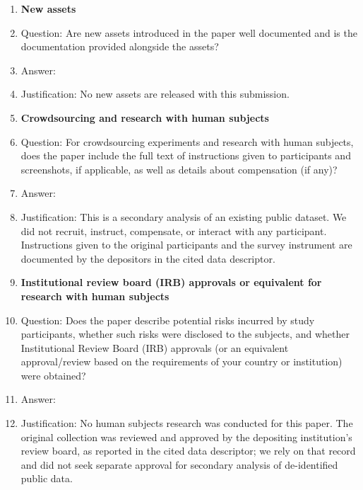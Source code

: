 \begin{enumerate}
\item {\bf New assets}
    \item[] Question: Are new assets introduced in the paper well documented and is the documentation provided alongside the assets?
    \item[] Answer: \answerNA{}
    \item[] Justification: No new assets are released with this submission.

\item {\bf Crowdsourcing and research with human subjects}
    \item[] Question: For crowdsourcing experiments and research with human subjects, does the paper include the full text of instructions given to participants and screenshots, if applicable, as well as details about compensation (if any)?
    \item[] Answer: \answerNA{}
    \item[] Justification: This is a secondary analysis of an existing public dataset. We did not recruit, instruct, compensate, or interact with any participant. Instructions given to the original participants and the survey instrument are documented by the depositors in the cited data descriptor.

\item {\bf Institutional review board (IRB) approvals or equivalent for research with human subjects}
    \item[] Question: Does the paper describe potential risks incurred by study participants, whether such risks were disclosed to the subjects, and whether Institutional Review Board (IRB) approvals (or an equivalent approval/review based on the requirements of your country or institution) were obtained?
    \item[] Answer: \answerNA{}
    \item[] Justification: No human subjects research was conducted for this paper. The original collection was reviewed and approved by the depositing institution's review board, as reported in the cited data descriptor; we rely on that record and did not seek separate approval for secondary analysis of de-identified public data.


\end{enumerate}

